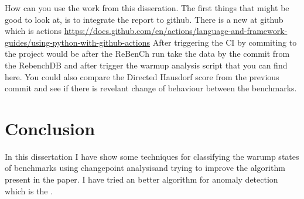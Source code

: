 \documentclass{article}
\begin{document}
How can you use the work from this disseration.
The first things that might be good to look at, is to integrate the report to github. There is a new  at github which is  actions \url{https://docs.github.com/en/actions/language-and-framework-guides/using-python-with-github-actions}
After triggering the CI by commiting to the project would be after the ReBenCh run take the data by the commit from the RebenchDB and after trigger the warmup analysis script that you can find here.
You could also compare the Directed Hausdorf score from the previous commit and see if there is revelant change of behaviour between the benchmarks.


\section{Conclusion}

In this dissertation I have show some techniques for classifying the warump states of benchmarks using changepoint analysisand trying to improve the algorithm present in the paper. I have tried an better algorithm for anomaly detection which is the .


\end{document}
